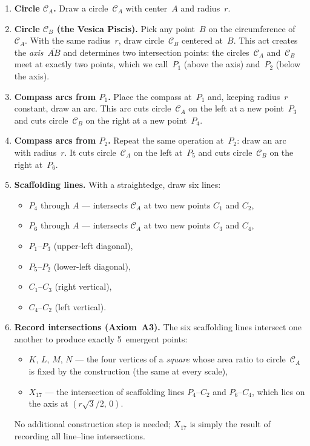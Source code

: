 \documentclass[12pt, a4paper]{article}
\begin{document}
\begin{enumerate}[label=\textbf{Step \arabic*.}, leftmargin=3.5em]

\item \textbf{Circle $\mathcal{C}_A$.}
Draw a circle~$\mathcal{C}_A$ with center~$A$ and radius~$r$.

\item \textbf{Circle $\mathcal{C}_B$ (the Vesica Piscis).}
Pick any point~$B$ on the circumference of~$\mathcal{C}_A$. With the same radius~$r$, draw circle~$\mathcal{C}_B$ centered at~$B$. This act creates the \emph{axis}~$\overline{AB}$ and determines two intersection points: the circles~$\mathcal{C}_A$ and~$\mathcal{C}_B$ meet at exactly two points, which we call~$P_1$ (above the axis) and~$P_2$ (below the axis).

\item \textbf{Compass arcs from $P_1$.}
Place the compass at~$P_1$ and, keeping radius~$r$ constant, draw an arc. This arc cuts circle~$\mathcal{C}_A$ on the left at a new point~$P_3$ and cuts circle~$\mathcal{C}_B$ on the right at a new point~$P_4$.

\item \textbf{Compass arcs from $P_2$.}
Repeat the same operation at~$P_2$: draw an arc with radius~$r$. It cuts circle~$\mathcal{C}_A$ on the left at~$P_5$ and cuts circle~$\mathcal{C}_B$ on the right at~$P_6$.

\item \textbf{Scaffolding lines.}
With a straightedge, draw six lines:
\begin{itemize}[nosep]
    \item $P_4$ through $A$ --- intersects $\mathcal{C}_A$ at two new points $C_1$ and $C_2$,
    \item $P_6$ through $A$ --- intersects $\mathcal{C}_A$ at two new points $C_3$ and $C_4$,
    \item $P_1$--$P_3$ (upper-left diagonal),
    \item $P_5$--$P_2$ (lower-left diagonal),
    \item $C_1$--$C_3$ (right vertical),
    \item $C_4$--$C_2$ (left vertical).
\end{itemize}

\item \textbf{Record intersections (Axiom~A3).}
The six scaffolding lines intersect one another to produce exactly 5~emergent points:
\begin{itemize}[nosep]
    \item $K$, $L$, $M$, $N$ --- the four vertices of a \emph{square} whose area ratio to circle~$\mathcal{C}_A$ is fixed by the construction (the same at every scale),
    \item $X_{17}$ --- the intersection of scaffolding lines $P_4$--$C_2$ and $P_6$--$C_4$, which lies on the axis at $(r\sqrt{3}/2,\, 0)$.
\end{itemize}
No additional construction step is needed; $X_{17}$ is simply the result of recording all line--line intersections.
\end{enumerate}
\end{document}
